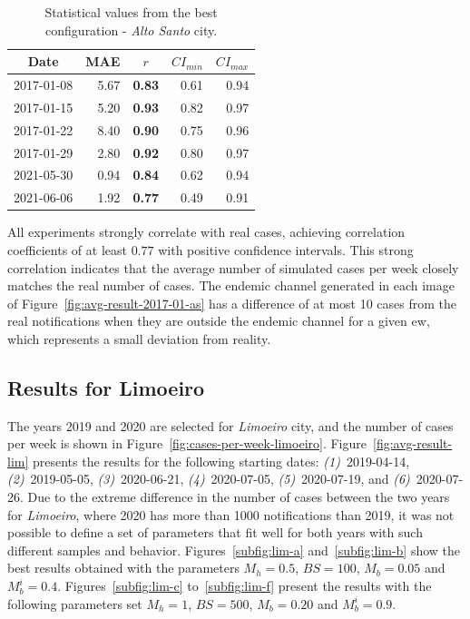 \begin{table}[!ht]
\centering
\caption{Statistical values from the best configuration - \textit{Alto Santo} city.}
\label{tab:statistical-data-as}
\small{%
\begin{tabular}{lrrrr}
\toprule
  \multicolumn{1}{c}{\textbf{Date}} &
  \multicolumn{1}{c}{\textbf{MAE}} &
  \multicolumn{1}{c}{\textbf{$r$}} &
  \multicolumn{1}{c}{\textbf{$CI_{min}$}} &
  \multicolumn{1}{c}{\textbf{$CI_{max}$}} \\ \midrule
2017-01-08 & 5.67  & \textbf{0.83} & 0.61  & 0.94 \\
2017-01-15 & 5.20  & \textbf{0.93} & 0.82  & 0.97 \\
2017-01-22 & 8.40  & \textbf{0.90}  & 0.75  & 0.96 \\
2017-01-29 & 2.80  & \textbf{0.92} & 0.80  & 0.97 \\
2021-05-30 & 0.94  & \textbf{0.84} & 0.62  & 0.94 \\
2021-06-06 & 1.92  & \textbf{0.77} & 0.49  & 0.91 \\ \bottomrule
\end{tabular}%
}
\end{table}

All experiments strongly correlate with real cases, achieving correlation coefficients of at least $0.77$ with positive confidence intervals. This strong correlation indicates that the average number of simulated cases per week closely matches the real number of cases. The endemic channel generated in each image of Figure~\ref{fig:avg-result-2017-01-as} has a difference of at most 10 cases from the real notifications when they are outside the endemic channel for a given \gls{ew}, which represents a small deviation from reality.

\subsection{Results for Limoeiro}\label{subsec:results-limoeiro}

The years 2019 and 2020 are selected for \textit{Limoeiro} city, and the number of cases per week is shown in Figure~\ref{fig:cases-per-week-limoeiro}. 
Figure~\ref{fig:avg-result-lim} presents the results for the following starting dates: \textit{(1)}~2019-04-14, \textit{(2)}~2019-05-05, \textit{(3)}~2020-06-21, \textit{(4)}~2020-07-05, \textit{(5)}~2020-07-19, and \textit{(6)}~2020-07-26. 
Due to the extreme difference in the number of cases between the two years for \textit{Limoeiro}, where 2020 has more than 1000 notifications than 2019, it was not possible to define a set of parameters that fit well for both years with such different samples and behavior.
Figures~\ref{subfig:lim-a} and~\ref{subfig:lim-b} show the best results obtained with the parameters $M_h = 0.5$, $BS = 100$, $M_b = 0.05$ and $M_b^{i} = 0.4$. Figures~\ref{subfig:lim-c} to~\ref{subfig:lim-f} present the results with the following parameters set $M_h = 1$, $BS = 500$, $M_b = 0.20$ and $M_b^{i} = 0.9$.


